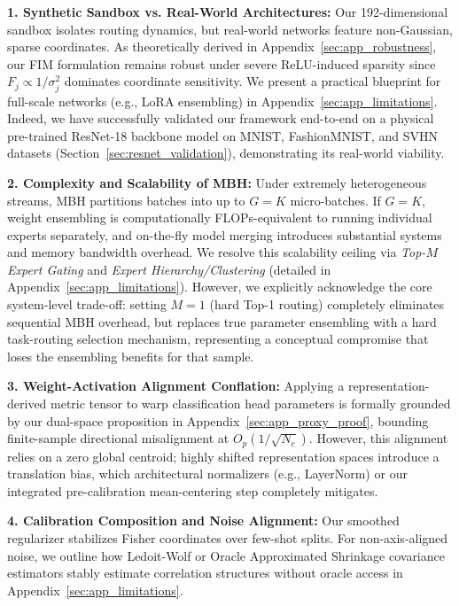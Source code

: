 \textbf{1. Synthetic Sandbox vs. Real-World Architectures:} Our 192-dimensional sandbox isolates routing dynamics, but real-world networks feature non-Gaussian, sparse coordinates. As theoretically derived in Appendix~\ref{sec:app_robustness}, our FIM formulation remains robust under severe ReLU-induced sparsity since $F_j \propto 1/\sigma_j^2$ dominates coordinate sensitivity. We present a practical blueprint for full-scale networks (e.g., LoRA ensembling) in Appendix~\ref{sec:app_limitations}. Indeed, we have successfully validated our framework end-to-end on a physical pre-trained ResNet-18 backbone model on MNIST, FashionMNIST, and SVHN datasets (Section~\ref{sec:resnet_validation}), demonstrating its real-world viability.

\textbf{2. Complexity and Scalability of MBH:} Under extremely heterogeneous streams, MBH partitions batches into up to $G = K$ micro-batches. If $G=K$, weight ensembling is computationally FLOPs-equivalent to running individual experts separately, and on-the-fly model merging introduces substantial systems and memory bandwidth overhead. We resolve this scalability ceiling via \emph{Top-$M$ Expert Gating} and \emph{Expert Hierarchy/Clustering} (detailed in Appendix~\ref{sec:app_limitations}). However, we explicitly acknowledge the core system-level trade-off: setting $M=1$ (hard Top-1 routing) completely eliminates sequential MBH overhead, but replaces true parameter ensembling with a hard task-routing selection mechanism, representing a conceptual compromise that loses the ensembling benefits for that sample.

\textbf{3. Weight-Activation Alignment Conflation:} Applying a representation-derived metric tensor to warp classification head parameters is formally grounded by our dual-space proposition in Appendix~\ref{sec:app_proxy_proof}, bounding finite-sample directional misalignment at $O_p(1/\sqrt{N_c})$. However, this alignment relies on a zero global centroid; highly shifted representation spaces introduce a translation bias, which architectural normalizers (e.g., LayerNorm) or our integrated pre-calibration mean-centering step completely mitigates.

\textbf{4. Calibration Composition and Noise Alignment:} Our smoothed regularizer stabilizes Fisher coordinates over few-shot splits. For non-axis-aligned noise, we outline how Ledoit-Wolf or Oracle Approximated Shrinkage covariance estimators stably estimate correlation structures without oracle access in Appendix~\ref{sec:app_limitations}.

